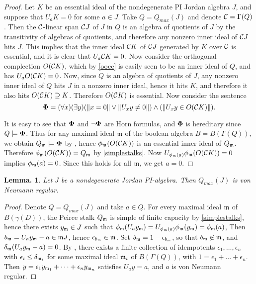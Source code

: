 \documentclass[a4paper,twoside,11pt]{article}
\theoremstyle{plain}
\theoremstyle{miestilo}
\newtheorem{lema}[subsection]{Lemma.}
\theoremstyle{misnotas}
\begin{document}
\begin{proof} Let $K$ be an essential ideal of the nondegenerate PI Jordan algebra $J$, and
suppose that $U_aK = 0$ for some $a\in J$. Take $Q= Q_{max}(J)$ and denote $\mathcal C = \Gamma(Q)$.
Then the $\mathcal C$-linear span $\mathcal C J$ of $J$ in $Q$ is an algebra of quotients of $J$ by the
transitivity of algebras of quotients, and therefore any nonzero inner ideal of $\mathcal C J$ hits
$J$. This implies that the inner ideal $\mathcal C K$ of $\mathcal C J$ generated by $K$ over $\mathcal C$ is
essential, and it is clear that $U_a\mathcal C K = 0$. Now consider the orthogonal complection
$O(\mathcal C K)$, which by \ref{oocc} is easily seen to be an inner ideal of $Q$, and has $U_aO(\mathcal C
K)= 0$. Now, since $Q$ is an algebra of quotients of $J$, any nonzero inner ideal of $Q$
hits $J$ in a nonzero inner ideal, hence it hits $K$, and therefore it also hits $O(\mathcal C K)
\supseteq K$. Therefore $O(\mathcal C K)$ is essential. Now consider the sentence
$${\boldsymbol \Phi} = (\forall x)(\exists y)(\Vert x = 0\Vert \lor \Vert U_xy \ne
0\Vert)\land(\Vert U_xy \in O(\mathcal C K)\Vert).$$

It is easy to see that ${\mathbf{\Phi}}$ and $\neg{\mathbf{\Phi}}$ are Horn formulas, and  ${\bm
\Phi}$ is hereditary since $Q\models {\mathbf{\Phi}}$. Thus for any maximal ideal $\frak m$ of
the boolean algebra $B = B(\Gamma(Q))$, we obtain $Q_{\frak m}\models {\mathbf{\Phi}}$ by
\cite[3.2.11]{bmami}, hence $\phi_{\frak m}(O(\mathcal C K))$ is an essential inner ideal of $Q_{\frak m}$.
Therefore $\phi_{\frak m}(O(\mathcal C K)) = Q_{\frak m}$ by \ref{simplestalks}. Now $U_{\phi_{\frak
m}(a)}\phi_{\frak m}(O(\mathcal C K))= 0$ implies $\phi_{\frak m}(a) = 0$. Since this holds for all
$\frak m$, we get $a = 0$.\end{proof}

\begin{lema}\label{VNR}Let $J$ be a nondegenerate Jordan PI-algebra. Then $Q_{max}(J)$ is von
Neumann regular.\end{lema}

\begin{proof}Denote $Q = Q_{max}(J)$ and take $a \in Q$. For every maximal ideal $\frak m$ of
$B(\gamma(D))$, the Peirce stalk $Q_{\frak m}$ is simple of finite capacity by
\ref{simplestalks}, hence there exists $y_{\frak m} \in J$ such that $\phi_{\frak
m}(U_ay_{\frak m}) = U_{\phi_{\frak m}(a)}\phi_{\frak m}(y_{\frak m}) = \phi_{\frak m}(a)$, Then
$b_{\frak m} = U_ay_{\frak m}-a \in \frak mJ$, hence $\epsilon_{b_{\frak m}} \in \frak m$. Set
$\delta_{\frak m} = 1-\epsilon_{b_{\frak m}}$, so that $\delta_{\frak m} \not\in \frak m$, and
$\delta_{\frak m}(U_ay_{\frak m} - a) = 0$. By \cite[3.1.2]{bmami}, there exists a finite collection
of idempotents $\epsilon_1, \dots, \epsilon_n$ with $\epsilon_i \le \delta_{{\frak m}_i}$
for some maximal ideal ${\frak m}_i$ of $B(\Gamma(Q))$, with $1 =
\epsilon_1+\dots+\epsilon_n$. Then $y = \epsilon_1y_{{\frak m}_1}+\dots + \epsilon_ny_{{\frak
m}_n}$ satisfies $U_ay = a$, and $a$ is von Neumann regular.\end{proof}
\end{document}
